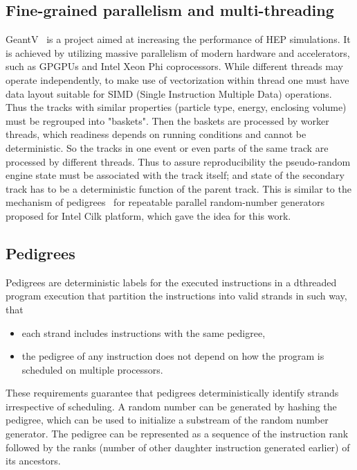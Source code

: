 \documentclass[a4paper, 12pt]{article} %
\begin{document}
  \subsection{Fine-grained parallelism and multi-threading}
   GeantV~\cite{1742-6596-523-1-012004} is a project aimed at increasing the performance of HEP simulations.
   It is achieved by utilizing massive parallelism of modern hardware and accelerators, such as GPGPUs and Intel Xeon Phi coprocessors.
   While different threads may operate independently, to make use of vectorization within thread one must have data layout suitable for SIMD (Single Instruction Multiple Data) operations.
   Thus the tracks with similar properties (particle type, energy, enclosing volume) must be regrouped into "baskets".
   Then the baskets are processed by worker threads, which readiness depends on running conditions and cannot be deterministic.
   So the tracks in one event or even parts of the same track are processed by different threads.
   Thus to assure reproducibility the pseudo-random engine state must be associated with the track itself;
   and state of the secondary track has to be a deterministic function of the parent track.
   This is similar to the mechanism of pedigrees~\cite{Leiserson:2012:DPR:2145816.2145841, Leiserson:2012:DPR:2370036.2145841} for repeatable parallel random-number generators proposed for Intel Cilk platform, which gave the idea for this work.
   
  \subsection{Pedigrees}
   Pedigrees are deterministic labels for the executed instructions in a dthreaded program execution that partition the instructions into valid strands in such way, that
   \begin{itemize}
    \item each strand includes instructions with the same pedigree,
    \item the pedigree of any instruction does not depend on how the program is scheduled on multiple processors.
   \end{itemize}
   These requirements guarantee that pedigrees deterministically identify strands irrespective of scheduling.
   A random number can be generated by hashing the pedigree, which can be used to initialize a substream of the random number generator.
   The pedigree can be represented as a sequence of the instruction rank followed by the ranks (number of other daughter instruction generated earlier) of its ancestors.
   
\end{document}

